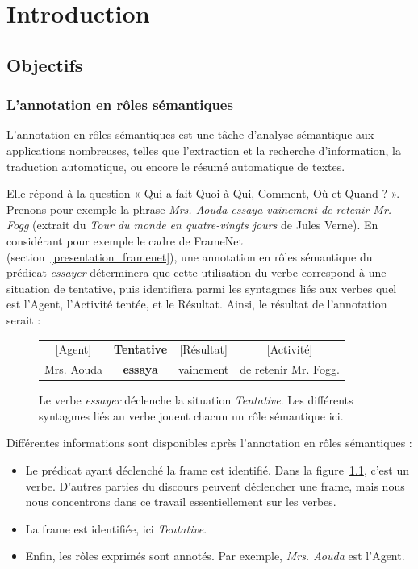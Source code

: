 \chapter{Introduction}
\label{ch:intro}

\section{Objectifs}

\subsection{L'annotation en rôles sémantiques}

L'annotation en rôles sémantiques est une tâche d'analyse sémantique aux
applications nombreuses, telles que l'extraction et la recherche d'information,
la traduction automatique, ou encore le résumé automatique de textes.

Elle répond à la question « Qui a fait Quoi à Qui, Comment, Où et Quand ? ».
Prenons pour exemple la phrase \emph{Mrs. Aouda essaya vainement de retenir Mr.
Fogg} (extrait du \emph{Tour du monde en quatre-vingts jours} de Jules Verne).
En considérant pour exemple le cadre de FrameNet
(section~\ref{presentation_framenet}), une annotation en rôles sémantique du
prédicat \emph{essayer} déterminera que cette utilisation du verbe correspond à
une situation de tentative, puis identifiera parmi les syntagmes liés aux
verbes quel est l'Agent, l'Activité tentée, et le Résultat.  Ainsi, le résultat
de l'annotation serait :

\begin{figure}[ht]
    \centering
    \begin{tabular}{cccc}
    [Agent]  & \textbf{Tentative} & [Résultat]  & [Activité]         \tabularnewline
    Mrs. Aouda & \textbf{essaya}  & vainement & de retenir Mr. Fogg. \tabularnewline
    \end{tabular}
    \caption{\label{fig:introsrl}Le verbe \emph{essayer} déclenche la situation \emph{Tentative}.
    Les différents syntagmes liés au verbe jouent chacun un rôle sémantique ici.}
\end{figure}

Différentes informations sont disponibles après l'annotation en rôles
sémantiques :

\begin{itemize}
    \item Le prédicat ayant déclenché la frame est identifié. Dans la
        figure~\ref{fig:introsrl}, c'est un verbe. D'autres parties du
        discours peuvent déclencher une frame, mais nous nous concentrons dans
        ce travail essentiellement sur les verbes.
    \item La frame est identifiée, ici \emph{Tentative}.
    \item Enfin, les rôles exprimés sont annotés. Par exemple, \emph{Mrs.
        Aouda} est l'Agent.
\end{itemize}

